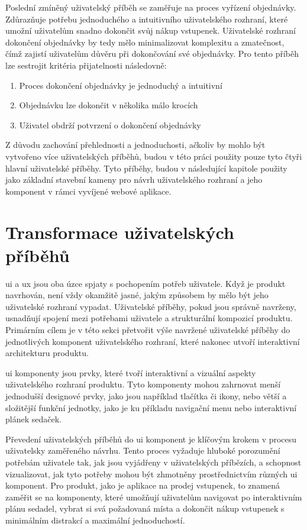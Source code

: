 Poslední zmíněný uživatelský příběh se zaměřuje na proces vyřízení objednávky.
Zdůrazňuje potřebu jednoduchého a intuitivního uživatelského rozhraní, které umožní uživatelům snadno dokončit svůj nákup vstupenek.
Uživatelské rozhraní dokončení objednávky by tedy mělo minimalizovat komplexitu a zmatečnost, čímž zajistí uživatelům důvěru při dokončování své objednávky.
Pro tento příběh lze sestrojit kritéria přijatelnosti následovně:
\begin{enumerate}
    \item Proces dokončení objednávky je jednoduchý a intuitivní
    \item Objednávku lze dokončit v několika málo krocích
    \item Uživatel obdrží potvrzení o dokončení objednávky
\end{enumerate}

Z důvodu zachování přehlednosti a jednoduchosti, ačkoliv by mohlo být vytvořeno více uživatelských příběhů, budou v této práci použity pouze tyto čtyři hlavní uživatelské příběhy.
Tyto příběhy, budou v následující kapitole použity jako základní stavební kameny pro návrh uživatelského rozhraní a jeho komponent v rámci vyvíjené webové aplikace.


\section{Transformace uživatelských příběhů}
\label{sec:navrh-ui-transformace-uzivatelskych-pribehu}
\acl{ui} a \acl{ux} jsou oba úzce spjaty s pochopením potřeb uživatele.
Když je produkt navrhován, není vždy okamžitě jasné, jakým způsobem by mělo být jeho uživatelské rozhraní vypadat.
Uživatelské příběhy, pokud jsou správně navrženy, usnadňují spojení mezi potřebami uživatele a strukturální kompozicí produktu.
Primárním cílem je v této sekci přetvořit výše navržené uživatelské příběhy do jednotlivých komponent uživatelského rozhraní, které nakonec utvoří interaktivní architekturu produktu.

\ac{ui} komponenty jsou prvky, které tvoří interaktivní a vizuální aspekty uživatelského rozhraní produktu.
Tyto komponenty mohou zahrnovat menší jednodušší designové prvky, jako jsou například tlačítka či ikony, nebo větší a složitější funkční jednotky, jako je ku příkladu navigační menu nebo interaktivní plánek sedaček.

Převedení uživatelských příběhů do \ac{ui} komponent je klíčovým krokem v procesu uživatelsky zaměřeného návrhu.
Tento proces vyžaduje hluboké porozumění potřebám uživatele tak, jak jsou vyjádřeny v uživatelských příbězích, a schopnost vizualizovat, jak tyto potřeby mohou být zhmotněny prostřednictvím různých \ac{ui} komponent.
Pro produkt, jako je aplikace na prodej vstupenek, to znamená zaměřit se na komponenty, které umožňují uživatelům navigovat po interaktivním plánu sedadel, vybrat si svá požadovaná místa a dokončit nákup vstupenek s minimálním distrakcí a maximální jednoduchostí.

